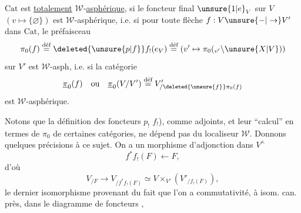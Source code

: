 
$\mathrm{Cat}$ est \uline{totalement} $\mathcal W$-\uline{asphérique}, si le foncteur
final $\unsure{1|e}_V$ sur $V$ $(v\mapsto\{\varnothing\})$ est  $\mathcal W$-asphérique,
i.e. si pour toute flèche $f:V\unsure{-|\to}V'$ dans $\mathrm{Cat}$,
le  préfaisceau
\[
 \pi_0(f)\overset{\text{déf}}{=}\deleted{\unsure{p|f}}f_!(e_V)\overset{\text{déf}}{=}
 (v'\mapsto\pi_0({}_{v'}\backslash\unsure{X|V}))
\]
sur $V'$ est $\mathcal W$-asph, i.e. si la catégorie
\[
 \underline{\pi}_0(f)\quad\text{ou}\quad\underline{\pi}_0(V/V')
 \overset{\text{déf}}{=}V'_{/\deleted{\unsure{f}}\pi_0(f)}
\]
est $\mathcal W$-asphérique.

Notons que la  définition des foncteurs
$p_!$  $f_!$),  comme adjoints, et leur
``calcul'' en termes de $\pi_0$ de certaines catégories,
ne dépend pas du localiseur $\mathcal W$. Donnons
quelques précisions à ce sujet. On a un
morphisme d'adjonction dans $V^\wedge$
\[
 f^*f_!(F)\longleftarrow F,
\]
d'où
\[
 V_{/F}\longrightarrow V_{/f^*f_!(F)}\simeq V\times_{V'}(V'_{/f_!(F)}),\tag*{(*)}
\]
le dernier isomorphisme provenant du fait que
l'on a commutativité, à isom. can. près, dans
le diagramme de foncteurs
\noindent,

